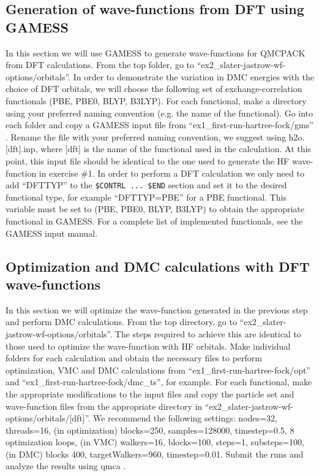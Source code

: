 \subsection{Generation of wave-functions from DFT using GAMESS}
In this section we will use GAMESS to generate wave-functions for QMCPACK from
DFT calculations. From the top folder, go to ``ex2\_slater-jastrow-wf-options/orbitals''. In order to demonstrate
the variation in DMC energies with the choice of DFT orbitals, we will choose the following
set of exchange-correlation functionals (PBE, PBE0, BLYP, B3LYP). For each functional,
make a directory using your preferred naming convention (e.g. the name of the functional).
Go into each folder and copy a GAMESS input file from %
``ex1\_first-run-hartree-fock/gms'' .%
Rename the file with your preferred naming convention, we suggest using h2o.[dft].inp, where [dft] is the name of
the functional used in the calculation. At this point, this input file should be identical to the
one used to generate the HF wave-function in exercise \#1. In order to perform a DFT
calculation we only need to add ``DFTTYP'' to the \texttt{\$CONTRL ... \$END} section and set
it to the desired functional type, for example ``DFTTYP=PBE'' for a PBE functional. This
variable must be set to (PBE, PBE0, BLYP, B3LYP) to obtain the appropriate functional in
GAMESS. For a complete list of implemented functionals, see the GAMESS input manual.


\subsection{Optimization and DMC calculations with DFT wave-functions}
In this section we will optimize the wave-function generated in the previous step and
perform DMC calculations. From the top directory, go to “ex2\_slater-jastrow-wf-options/orbitals”.
The steps required to achieve this are identical to those used to optimize the wave-function
with HF orbitals. Make individual folders for each calculation and obtain the necessary files
to perform optimization, VMC and DMC calculations from ``ex1\_first-run-hartree-fock/opt'' and ``ex1\_first-run-hartree-fock/dmc\_ts'', for example.
For each functional, make the appropriate modifications to the input files and copy the particle 
set and wave-function files from the appropriate directory in “ex2\_slater-jastrow-wf-options/orbitals/[dft]”. We
recommend the following settings: nodes=32, threads=16, (in optimization) blocks=250,
samples=128000, timestep=0.5, 8 optimization loops, (in VMC) walkers=16, blocks=100,
steps=1, substeps=100, (in DMC) blocks 400, targetWalkers=960, timestep=0.01. Submit
the runs and analyze the results using qmca .

